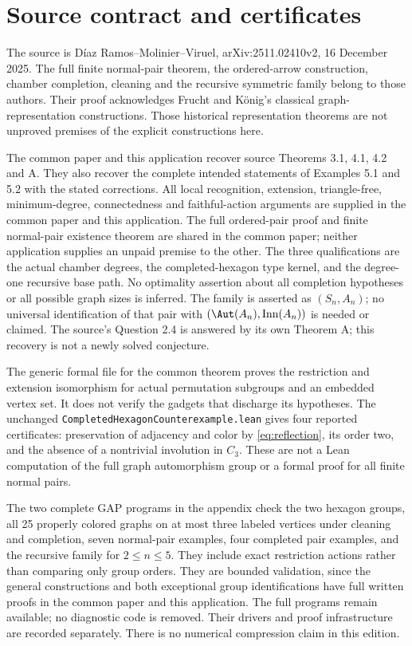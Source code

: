\section{Source contract and certificates}
\label{sec:scope}
The source is D\'iaz Ramos--Molinier--Viruel, arXiv:2511.02410v2,
16 December 2025. The full finite normal-pair theorem, the ordered-arrow
construction, chamber completion, cleaning and the recursive symmetric family
belong to those authors. Their proof acknowledges Frucht and K\"onig's
classical graph-representation constructions. Those historical representation
theorems are not unproved premises of the explicit constructions here.

The common paper and this application recover source Theorems 3.1, 4.1, 4.2
and A. They also recover the complete intended statements of Examples 5.1
and 5.2 with the stated corrections. All local recognition, extension,
triangle-free, minimum-degree, connectedness and faithful-action arguments
are supplied in the common paper and this application. The full
ordered-pair proof and finite normal-pair existence theorem are shared
in the common paper; neither application supplies an unpaid premise
to the other. The three qualifications are the actual chamber degrees,
the completed-hexagon type kernel, and the degree-one recursive base path.
No optimality assertion about all completion hypotheses or all possible
graph sizes is inferred. The family is asserted as $(S_n,A_n)$; no universal
identification of that pair with $(\Aut(A_n),\operatorname{Inn}(A_n))$ is
needed or claimed. The source's Question 2.4 is answered by its own
Theorem A; this recovery is not a newly solved conjecture.

The generic formal file for the common theorem proves the restriction and
extension isomorphism for actual permutation subgroups and an embedded
vertex set. It does not verify the gadgets that discharge its hypotheses.
The unchanged \texttt{CompletedHexagonCounterexample.lean} gives four
reported certificates: preservation of adjacency and color by
\eqref{eq:reflection}, its order two, and the absence of a nontrivial
involution in $C_3$. These are not a Lean computation of the full graph
automorphism group or a formal proof for all finite normal pairs.

The two complete GAP programs in the appendix check the two hexagon groups,
all 25 properly colored graphs on at most three labeled vertices under
cleaning and completion, seven normal-pair examples, four completed pair
examples, and the recursive family for $2\leq n\leq5$. They include exact
restriction actions rather than comparing only group orders. They are
bounded validation, since the general constructions and both exceptional
group identifications have full written proofs in the common paper
and this application. The full programs
remain available; no diagnostic code is removed. Their drivers and proof
infrastructure are recorded separately. There is no numerical compression
claim in this edition.

